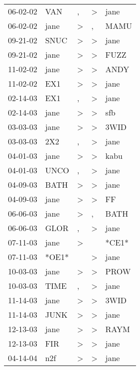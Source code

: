 \begin{supertabular}{lllll}
 06-02-02 &    VAN &             , &     \textgreater &   jane \\
 06-02-02 &   jane &  \textgreater &                , &   MAMU \\
 09-21-02 &   SNUC &  \textgreater &     \textgreater &   jane \\
 09-21-02 &   jane &  \textgreater &     \textgreater &   FUZZ \\
 11-02-02 &   jane &  \textgreater &     \textgreater &   ANDY \\
 11-02-02 &    EX1 &  \textgreater &     \textgreater &   jane \\
 02-14-03 &    EX1 &             , &     \textgreater &   jane \\
 02-14-03 &   jane &  \textgreater &     \textgreater &    sfb \\
 03-03-03 &   jane &  \textgreater &     \textgreater &   3WID \\
 03-03-03 &    2X2 &             , &     \textgreater &   jane \\
 04-01-03 &   jane &  \textgreater &     \textgreater &   kabu \\
 04-01-03 &   UNCO &             , &     \textgreater &   jane \\
 04-09-03 &   BATH &  \textgreater &     \textgreater &   jane \\
 04-09-03 &   jane &  \textgreater &     \textgreater &     FF \\
 06-06-03 &   jane &  \textgreater &                , &   BATH \\
 06-06-03 &   GLOR &             , &     \textgreater &   jane \\
 07-11-03 &   jane &  \textgreater &                  &  *CE1* \\
 07-11-03 &  *OE1* &               &     \textgreater &   jane \\
 10-03-03 &   jane &  \textgreater &     \textgreater &   PROW \\
 10-03-03 &   TIME &             , &     \textgreater &   jane \\
 11-14-03 &   jane &  \textgreater &     \textgreater &   3WID \\
 11-14-03 &   JUNK &  \textgreater &     \textgreater &   jane \\
 12-13-03 &   jane &  \textgreater &     \textgreater &   RAYM \\
 12-13-03 &    FIR &  \textgreater &     \textgreater &   jane \\
 04-14-04 &    n2f &  \textgreater &     \textgreater &   jane \\

\end{supertabular}
